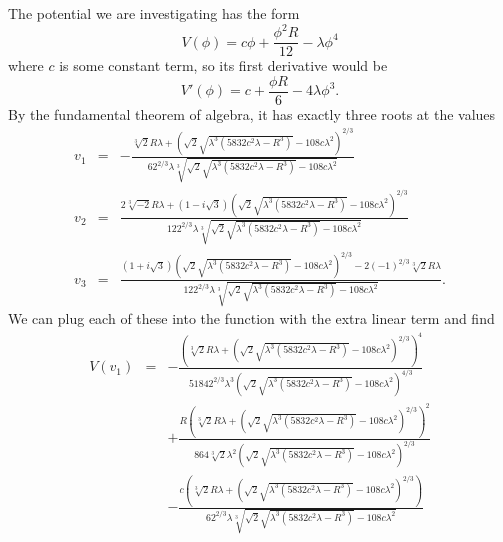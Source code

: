 The potential we are investigating has the form
\begin{equation}
V(\phi) = c\phi + \frac{\phi^{2}R}{12} - \lambda\phi^{4}
\end{equation}
where $c$ is some constant term, so its first derivative would be
\begin{equation}
V'(\phi) = c + \frac{\phi R}{6} - 4\lambda\phi^3.
\end{equation}
By the fundamental theorem of algebra, it has exactly three roots at the values
\begin{eqnarray*}
v_{1} &=& -\frac{\sqrt[3]{2} R \lambda +\left(\sqrt{2}
    \sqrt{\lambda ^3 \left(5832 c^2 \lambda -R^3\right)}-108 c \lambda
    ^2\right)^{2/3}}{6 2^{2/3} \lambda  \sqrt[3]{\sqrt{2} \sqrt{\lambda ^3
    \left(5832 c^2 \lambda -R^3\right)}-108 c \lambda ^2}} \\
v_{2} &=& \frac{2 \sqrt[3]{-2} R \lambda +\left(1-i \sqrt{3}\right)
    \left(\sqrt{2} \sqrt{\lambda ^3 \left(5832 c^2 \lambda -R^3\right)}-108 c
    \lambda ^2\right)^{2/3}}{12 2^{2/3} \lambda  \sqrt[3]{\sqrt{2}
    \sqrt{\lambda ^3 \left(5832 c^2 \lambda -R^3\right)}-108 c \lambda
    ^2}} \\
v_{3} &=& \frac{\left(1+i \sqrt{3}\right)
    \left(\sqrt{2} \sqrt{\lambda ^3 \left(5832 c^2 \lambda -R^3\right)}-108 c
    \lambda ^2\right)^{2/3}-2 (-1)^{2/3} \sqrt[3]{2} R \lambda }{12 2^{2/3}
    \lambda  \sqrt[3]{\sqrt{2} \sqrt{\lambda ^3 \left(5832 c^2 \lambda
    -R^3\right)}-108 c \lambda ^2}}.
\end{eqnarray*}
We can plug each of these into the function with the extra linear term
and find
\begin{eqnarray*}
V(v_{1}) &=&    -\frac{\left(\sqrt[3]{2} R \lambda +\left(\sqrt{2} \sqrt{\lambda ^3
    \left(5832 c^2 \lambda -R^3\right)}-108 c \lambda
    ^2\right)^{2/3}\right)^4}{5184 2^{2/3} \lambda ^3 \left(\sqrt{2}
    \sqrt{\lambda ^3 \left(5832 c^2 \lambda -R^3\right)}-108 c \lambda
    ^2\right)^{4/3}}\\
& &+\frac{R \left(\sqrt[3]{2} R \lambda +\left(\sqrt{2}
    \sqrt{\lambda ^3 \left(5832 c^2 \lambda -R^3\right)}-108 c \lambda
    ^2\right)^{2/3}\right)^2}{864 \sqrt[3]{2} \lambda ^2 \left(\sqrt{2}
    \sqrt{\lambda ^3 \left(5832 c^2 \lambda -R^3\right)}-108 c \lambda
    ^2\right)^{2/3}} \\
& &-\frac{c \left(\sqrt[3]{2} R \lambda +\left(\sqrt{2}
    \sqrt{\lambda ^3 \left(5832 c^2 \lambda -R^3\right)}-108 c \lambda
    ^2\right)^{2/3}\right)}{6 2^{2/3} \lambda  \sqrt[3]{\sqrt{2} \sqrt{\lambda
    ^3 \left(5832 c^2 \lambda -R^3\right)}-108 c \lambda ^2}}
\end{eqnarray*}
